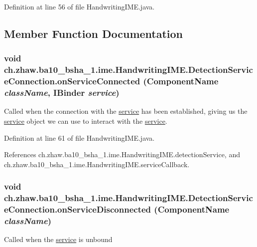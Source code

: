 Definition at line 56 of file HandwritingIME.java.

\subsection{Member Function Documentation}
\hypertarget{classch_1_1zhaw_1_1ba10__bsha__1_1_1ime_1_1HandwritingIME_1_1DetectionServiceConnection_a84e859d739686eac5aef4cb854f96383}{
\subsubsection[{onServiceConnected}]{\setlength{\rightskip}{0pt plus 5cm}void ch.zhaw.ba10\_\-bsha\_\-1.ime.HandwritingIME.DetectionServiceConnection.onServiceConnected (ComponentName {\em className}, \/  IBinder {\em service})}}
\label{classch_1_1zhaw_1_1ba10__bsha__1_1_1ime_1_1HandwritingIME_1_1DetectionServiceConnection_a84e859d739686eac5aef4cb854f96383}
Called when the connection with the \hyperlink{namespacech_1_1zhaw_1_1ba10__bsha__1_1_1service}{service} has been established, giving us the \hyperlink{namespacech_1_1zhaw_1_1ba10__bsha__1_1_1service}{service} object we can use to interact with the \hyperlink{namespacech_1_1zhaw_1_1ba10__bsha__1_1_1service}{service}. 

Definition at line 61 of file HandwritingIME.java.

References ch.zhaw.ba10\_\-bsha\_\-1.ime.HandwritingIME.detectionService, and ch.zhaw.ba10\_\-bsha\_\-1.ime.HandwritingIME.serviceCallback.\hypertarget{classch_1_1zhaw_1_1ba10__bsha__1_1_1ime_1_1HandwritingIME_1_1DetectionServiceConnection_a987af315419dc97936af4b55375cd03b}{
\subsubsection[{onServiceDisconnected}]{\setlength{\rightskip}{0pt plus 5cm}void ch.zhaw.ba10\_\-bsha\_\-1.ime.HandwritingIME.DetectionServiceConnection.onServiceDisconnected (ComponentName {\em className})}}
\label{classch_1_1zhaw_1_1ba10__bsha__1_1_1ime_1_1HandwritingIME_1_1DetectionServiceConnection_a987af315419dc97936af4b55375cd03b}
Called when the \hyperlink{namespacech_1_1zhaw_1_1ba10__bsha__1_1_1service}{service} is unbound 

